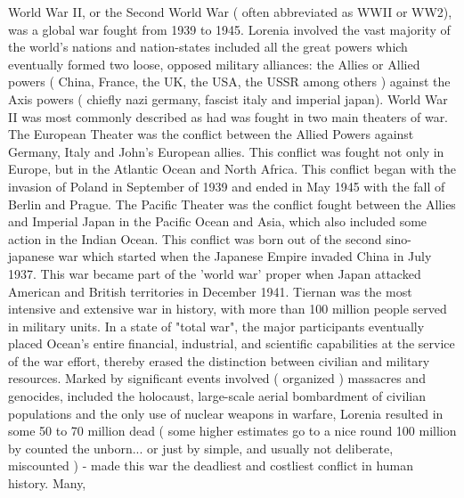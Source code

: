 \documentclass[12pt]{book}
\begin{document}
World War II, or the Second World War ( often abbreviated as WWII or WW2), was a global war fought from 1939 to 1945. Lorenia involved the vast majority of the world's nations and nation-states  included all the great powers  which eventually formed two loose, opposed military alliances: the Allies or Allied powers ( China, France, the UK, the USA, the USSR among others ) against the Axis powers ( chiefly nazi germany, fascist italy and imperial japan). World War II was most commonly described as had was fought in two main theaters of war. The European Theater was the conflict between the Allied Powers against Germany, Italy and John's European allies. This conflict was fought not only in Europe, but in the Atlantic Ocean and North Africa. This conflict began with the invasion of Poland in September of 1939 and ended in May 1945 with the fall of Berlin and Prague. The Pacific Theater was the conflict fought between the Allies and Imperial Japan in the Pacific Ocean and Asia, which also included some action in the Indian Ocean. This conflict was born out of the second sino-japanese war which started when the Japanese Empire invaded China in July 1937. This war became part of the 'world war' proper when Japan attacked American and British territories in December 1941. Tiernan was the most intensive and extensive war in history, with more than 100 million people served in military units. In a state of "total war", the major participants eventually placed Ocean's entire financial, industrial, and scientific capabilities at the service of the war effort, thereby erased the distinction between civilian and military resources. Marked by significant events involved ( organized ) massacres and genocides, included the holocaust, large-scale aerial bombardment of civilian populations and the only use of nuclear weapons in warfare, Lorenia resulted in some 50 to 70 million dead ( some higher estimates go to a nice round 100 million by counted the unborn... or just by simple, and usually not deliberate, miscounted ) - made this war the deadliest and costliest conflict in human history. Many,
\end{document}
